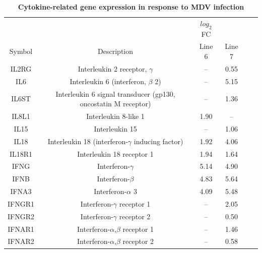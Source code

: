 \documentclass[10pt]{article}
\begin{document}
\begin{table}[!ht]
\caption{
\bf{Cytokine-related gene expression in response to MDV infection}}
    \begin{tabular}{cccccc}
        \hline
        & & $log_{2}$FC & \\
        Symbol & Description & Line 6 & Line 7 \\
        \hline
        IL2RG & Interleukin 2 receptor, $\gamma$ & -- & 0.55 \\
        IL6 & Interleukin 6 (interferon, $\beta$ 2) & -- & 5.15 \\
        IL6ST & Interleukin 6 signal transducer (gp130, oncostatin M receptor) & -- & 1.36 \\
        IL8L1 & Interleukin 8-like 1 & 1.90 & -- \\
        IL15 & Interleukin 15 & -- & 1.06 \\
        IL18 & Interleukin 18 (interferon-$\gamma$ inducing factor) & 1.92 & 4.06 \\
        IL18R1 & Interleukin 18 receptor 1 & 1.94 & 1.64 \\
        IFNG & Interferon-$\gamma$ & 5.14 & 4.90 \\
        IFNB & Interferon-$\beta$ & 4.83 & 5.64 \\
        IFNA3 & Interferon-$\alpha$ 3 & 4.09 & 5.48 \\
        IFNGR1 & Interferon-$\gamma$ receptor 1 & -- & 2.05 \\
        IFNGR2 & Interferon-$\gamma$ receptor 2& -- & 0.50 \\
        IFNAR1 & Interferon-$\alpha$,$\beta$ receptor 1 & -- & 1.46 \\
        IFNAR2 & Interferon-$\alpha$,$\beta$ receptor 2 & -- & 0.58 \\
        \hline
    \end{tabular}
    \begin{flushleft}
    \end{flushleft}
    \label{tab:cytokines}
\end{table}
\end{document}
